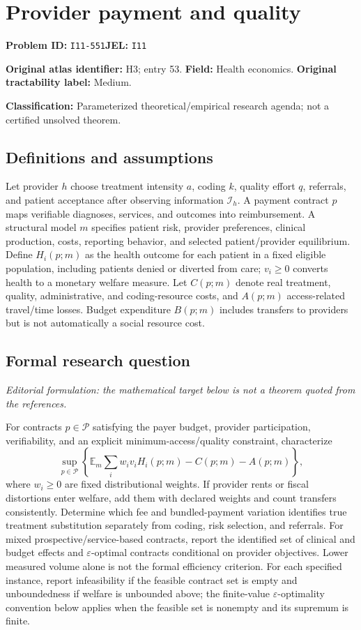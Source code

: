 \documentclass[11pt,a4paper]{article}
\begin{document}
\section*{Provider payment and quality}
\textbf{Problem ID:} \texttt{I11-551}\quad \textbf{JEL:} \texttt{I11}\par
\label{problem:OP-0053}
\label{atlas:prob:H3}
\noindent\textbf{Original atlas identifier:} H3; entry 53. \textbf{Field:} Health economics. \textbf{Original tractability label:} Medium.

\noindent\textbf{Classification:} Parameterized theoretical/empirical research agenda; not a certified unsolved theorem.

\subsection*{Definitions and assumptions}
Let provider $h$ choose treatment intensity $a$, coding $k$, quality effort $q$, referrals, and patient acceptance after observing information $\mathcal I_h$. A payment contract $p$ maps verifiable diagnoses, services, and outcomes into reimbursement. A structural model $m$ specifies patient risk, provider preferences, clinical production, costs, reporting behavior, and selected patient/provider equilibrium. Define $H_i(p;m)$ as the health outcome for each patient in a fixed eligible population, including patients denied or diverted from care; $v_i\geq0$ converts health to a monetary welfare measure. Let $C(p;m)$ denote real treatment, quality, administrative, and coding-resource costs, and $A(p;m)$ access-related travel/time losses. Budget expenditure $B(p;m)$ includes transfers to providers but is not automatically a social resource cost.

\subsection*{Formal research question}
\emph{Editorial formulation: the mathematical target below is not a theorem quoted from the references.}

For contracts $p\in\mathcal P$ satisfying the payer budget, provider participation, verifiability, and an explicit minimum-access/quality constraint, characterize
\[
 \sup_{p\in\mathcal P}\left\{\mathbb E_m\sum_i w_i v_iH_i(p;m)-C(p;m)-A(p;m)\right\},
\]
where $w_i\geq0$ are fixed distributional weights. If provider rents or fiscal distortions enter welfare, add them with declared weights and count transfers consistently. Determine which fee and bundled-payment variation identifies true treatment substitution separately from coding, risk selection, and referrals. For mixed prospective/service-based contracts, report the identified set of clinical and budget effects and $\varepsilon$-optimal contracts conditional on provider objectives. Lower measured volume alone is not the formal efficiency criterion. For each specified instance, report infeasibility if the feasible contract set is empty and unboundedness if welfare is unbounded above; the finite-value $\varepsilon$-optimality convention below applies when the feasible set is nonempty and its supremum is finite.
\end{document}
